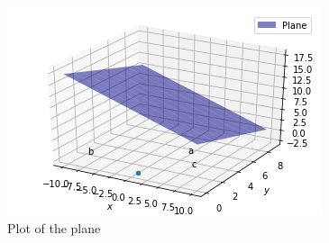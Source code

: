 \documentclass[journal,12pt,twocolumn]{IEEEtran}
\begin{document}
\begin{enumerate}
\begin{figure}[ht]
\centering
\includegraphics[width=\columnwidth]{Figure4.png}
\caption{Plot of the plane}
\label{Plot of the plane}
\end{figure}
\end{enumerate}
\end{document}

